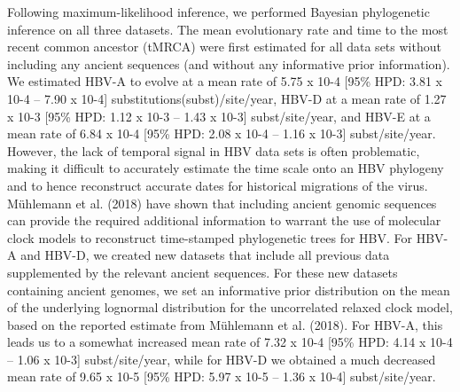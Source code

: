 

Following maximum-likelihood inference, we performed Bayesian phylogenetic inference on all three datasets. The mean evolutionary rate and time to the most recent common ancestor (tMRCA) were first estimated for all data sets without including any ancient sequences (and without any informative prior information). We estimated HBV-A to evolve at a mean rate of 5.75 x 10-4 [95\% HPD: 3.81 x 10-4 – 7.90 x 10-4] substitutions(subst)/site/year, HBV-D at a mean rate of 1.27 x 10-3 [95\% HPD: 1.12 x 10-3 – 1.43 x 10-3] subst/site/year, and HBV-E at a mean rate of 6.84 x 10-4 [95\% HPD: 2.08 x 10-4 – 1.16 x 10-3] subst/site/year. However, the lack of temporal signal in HBV data sets is often problematic, making it difficult to accurately estimate the time scale onto an HBV phylogeny and to hence reconstruct accurate dates for historical migrations of the virus. Mühlemann et al. (2018) have shown that including ancient genomic sequences can provide the required additional information to warrant the use of molecular clock models to reconstruct time-stamped phylogenetic trees for HBV. For HBV-A and HBV-D, we created new datasets that include all previous data supplemented by the relevant ancient sequences. For these new datasets containing ancient genomes, we set an informative prior distribution on the mean of the underlying lognormal distribution for the uncorrelated relaxed clock model, based on the reported estimate from Mühlemann et al. (2018). For HBV-A, this leads us to a somewhat increased mean rate of 7.32 x 10-4 [95\% HPD: 4.14 x 10-4 – 1.06 x 10-3] subst/site/year, while for HBV-D we obtained a much decreased mean rate of 9.65 x 10-5 [95\% HPD: 5.97 x 10-5 – 1.36 x 10-4] subst/site/year.

